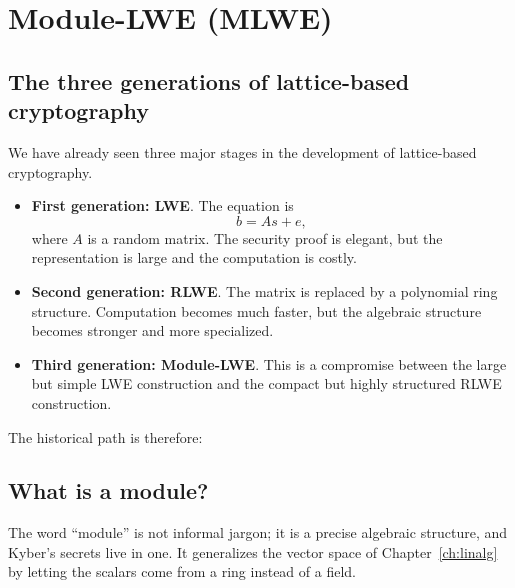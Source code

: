 \chapter{Module-LWE (MLWE)}
\label{ch:mlwe}

\section{The three generations of lattice-based cryptography}

We have already seen three major stages in the development of lattice-based cryptography.

\begin{itemize}
    \item \textbf{First generation: LWE}. The equation is
    \[
    b = A s + e,
    \]
    where $A$ is a random matrix. The security proof is elegant, but the representation is large and the computation is costly.

    \item \textbf{Second generation: RLWE}. The matrix is replaced by a polynomial ring structure. Computation becomes much faster, but the algebraic structure becomes stronger and more specialized.

    \item \textbf{Third generation: Module-LWE}. This is a compromise between the large but simple LWE construction and the compact but highly structured RLWE construction.
\end{itemize}

The historical path is therefore:

\begin{center}
\end{center}

\section{What is a module?}

The word ``module'' is not informal jargon; it is a precise algebraic structure, and Kyber's secrets live in one. It generalizes the vector space of Chapter~\ref{ch:linalg} by letting the scalars come from a ring instead of a field.

